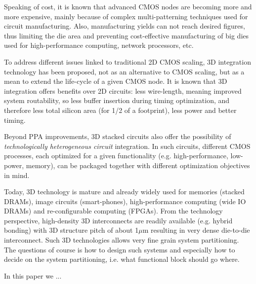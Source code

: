 \documentclass[conference]{IEEEtran}
\begin{document}
Speaking of cost, it is known that advanced CMOS nodes are becoming more and more expensive, mainly because of complex multi-patterning techniques used for circuit manufacturing. Also, manufacturing yields can not reach desired figures, thus limiting the die area and preventing cost-effective manufacturing of big dies used for high-performance computing, network processors, etc. 

To address different issues linked to traditional 2D CMOS scaling, 3D integration technology has been proposed, not as an alternative to CMOS scaling, but as a mean to extend the life-cycle of a given CMOS node. It is known that 3D integration offers benefits over 2D circuits: less wire-length, meaning improved system routability, so less buffer insertion during timing optimization, and therefore less total silicon area (for 1/2 of a footprint), less power and better timing. 

Beyond PPA improvements, 3D stacked circuits also offer the possibility of \emph{technologically heterogeneous circuit} integration. In such circuits, different CMOS processes, each optimized for a given functionality (e.g. high-performance, low-power, memory), can be packaged together with different optimization objectives in mind. 

Today, 3D technology is mature and already widely used for memories (stacked DRAMs), image circuits (smart-phones), high-performance computing (wide IO DRAMs) and re-configurable computing (FPGAs). From the technology perspective, high-density 3D interconnects are readily available (e.g. hybrid bonding) with 3D structure pitch of about 1$\mu$m resulting in very dense die-to-die interconnect. Such 3D technologies allows very fine grain system partitioning. The questions of course is how to design such systems and especially how to decide on the system partitioning, i.e. what functional block should go where. 

In this paper we ... 

\end{document}
